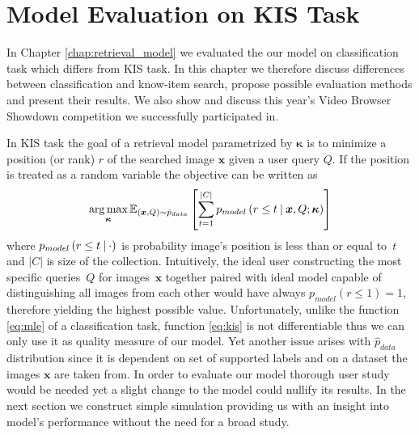 \chapter{Model Evaluation on KIS Task}\label{chap:evaluation}
In Chapter \ref{chap:retrieval_model} we evaluated the our model on classification task which differs from KIS task. In this chapter we therefore discuss differences between classification and know-item search, propose possible evaluation methods and present their results. We also show and discuss this year's Video Browser Showdown competition we successfully participated in.

In KIS task the goal of a retrieval model parametrized by $\bm{\kappa}$ is to minimize a position (or rank) $r$ of the searched image $\bm{x}$ given a user query $Q$. If the position is treated as a random variable the objective can be written as
\begin{equation}
\mathop{\arg\max}_{\bm{\kappa}}\mathbb{E}_{\left(\bm{x},Q\right)\sim \hat{p}_{data}}\left[
\sum_{t=1}^{|C|}p_{model}\left(r\leq t\:\vert\:\bm{x}, Q;\bm{\kappa}\right)
\right]\label{eq:kis}
\end{equation}
where $p_{model}\left(r\leq t\:\vert\:\cdot\right)$ is probability image's position is less than or equal to~$t$ and $|C|$ is size of the collection. Intuitively, the ideal user constructing the most specific queries~$Q$ for images~$\bm{x}$ together paired with ideal model capable of distinguishing all images from each other would have always ${p_{model}\left(r\leq 1\right)=1}$, therefore yielding the highest possible value. Unfortunately, unlike the function \ref{eq:mle} of a classification task, function \ref{eq:kis} is not differentiable thus we can only use it as quality measure of our model. Yet another issue arises with $\hat{p}_{data}$ distribution since it is dependent on set of supported labels and on a dataset the images $\bm{x}$ are taken from. In order to evaluate our model thorough user study would be needed yet a slight change to the model could nullify its results. In the next section we construct simple simulation providing us with an insight into model's performance without the need for a broad study.

